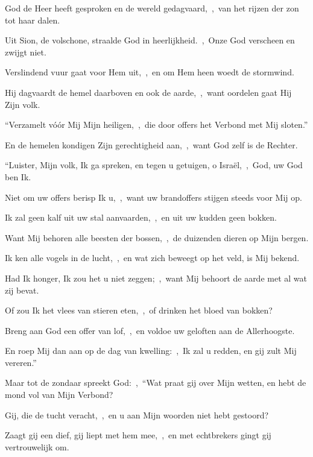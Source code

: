 \documentclass[12pt,twoside,a5paper]{article}
\begin{document}
\begin{halfparskip}

   God de Heer heeft gesproken en de wereld gedagvaard,~\sep\ van het rijzen der zon tot haar dalen.


  Uit Sion, de volschone, straalde God in heerlijkheid.~\sep\ Onze God verscheen en zwijgt niet.

  Verslindend vuur gaat voor Hem uit,~\sep\ en om Hem heen woedt de stormwind.

  Hij dagvaardt de hemel daarboven en ook de aarde,~\sep\ want oordelen gaat Hij Zijn volk.

  ``Verzamelt vóór Mij Mijn heiligen,~\sep\ die door offers het Verbond met Mij sloten.''

  En de hemelen kondigen Zijn gerechtigheid aan,~\sep\ want God zelf is de Rechter.

  ``Luister, Mijn volk, Ik ga spreken, en tegen u getuigen, o Israël,~\sep\ God, uw God ben Ik.

  Niet om uw offers berisp Ik u,~\sep\ want uw brandoffers stijgen steeds voor Mij op.

  Ik zal geen kalf uit uw stal aanvaarden,~\sep\ en uit uw kudden geen bokken.

  Want Mij behoren alle beesten der bossen,~\sep\ de duizenden dieren op Mijn bergen.

  Ik ken alle vogels in de lucht,~\sep\ en wat zich beweegt op het veld, is Mij bekend.

  Had Ik honger, Ik zou het u niet zeggen;~\sep\ want Mij behoort de aarde met al wat zij bevat.

  Of zou Ik het vlees van stieren eten,~\sep\ of drinken het bloed van bokken?

  Breng aan God een offer van lof,~\sep\ en voldoe uw geloften aan de Allerhoogste.

  En roep Mij dan aan op de dag van kwelling:~\sep\ Ik zal u redden, en gij zult Mij vereren.''

  Maar tot de zondaar spreekt God:~\sep\ ``Wat praat gij over Mijn wetten, en hebt de mond vol van Mijn Verbond?

  Gij, die de tucht veracht,~\sep\ en u aan Mijn woorden niet hebt gestoord?

  Zaagt gij een dief, gij liept met hem mee,~\sep\ en met echtbrekers gingt gij vertrouwelijk om.


\end{halfparskip}
\end{document}
